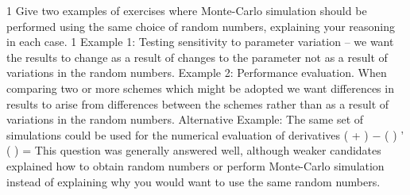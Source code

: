 
1 Give two examples of exercises where Monte-Carlo simulation should be performed
using the same choice of random numbers, explaining your reasoning in each case. 
1
Example 1: Testing sensitivity to parameter variation – we want the results to change
as a result of changes to the parameter not as a result of variations in the random
numbers.
Example 2: Performance evaluation. When comparing two or more schemes which
might be adopted we want differences in results to arise from differences between the
schemes rather than as a result of variations in the random numbers.
Alternative Example: The same set of simulations could be used for the numerical
evaluation of derivatives
\theta  ( \alpha  + \delta  ) − \theta  ( \alpha  )
\theta  ' ( \alpha  ) =
\delta 
This question was generally answered well, although weaker candidates explained
how to obtain random numbers or perform Monte-Carlo simulation instead of
explaining why you would want to use the same random numbers.
